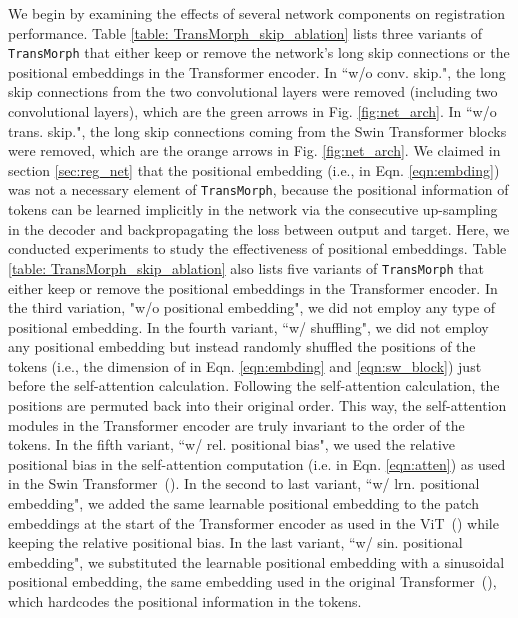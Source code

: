 \documentclass[times,twocolumn,final]{elsarticle}
\begin{document}
We begin by examining the effects of several network components on registration performance. Table \ref{table: TransMorph_skip_ablation} lists three variants of \texttt{TransMorph} that either keep or remove the network's long skip connections or the positional embeddings in the Transformer encoder. In ``w/o conv. skip.", the long skip connections from the two convolutional layers were removed (including two convolutional layers), which are the green arrows in Fig. \ref{fig:net_arch}. In ``w/o trans. skip.", the long skip connections coming from the Swin Transformer blocks were removed, which are the orange arrows in Fig. \ref{fig:net_arch}. We claimed in section \ref{sec:reg_net} that the positional embedding (i.e.,  in Eqn. \ref{eqn:embding}) was not a necessary element of \texttt{TransMorph}, because the positional information of tokens can be learned implicitly in the network via the consecutive up-sampling in the decoder and backpropagating the loss between output and target. Here, we conducted experiments to study the effectiveness of positional embeddings. Table \ref{table: TransMorph_skip_ablation} also lists five variants of \texttt{TransMorph} that either keep or remove the positional embeddings in the Transformer encoder. In the third variation, "w/o positional embedding", we did not employ any type of positional embedding. In the fourth variant, ``w/ shuffling", we did not employ any positional embedding but instead randomly shuffled the positions of the tokens (i.e., the dimension  of  in Eqn. \ref{eqn:embding} and \ref{eqn:sw_block}) just before the self-attention calculation. Following the self-attention calculation, the positions are permuted back into their original order. This way, the self-attention modules in the Transformer encoder are truly invariant to the order of the tokens. In the fifth variant, ``w/ rel. positional bias", we used the relative positional bias in the self-attention computation (i.e.  in Eqn. \ref{eqn:atten}) as used in the Swin Transformer~(\cite{liu2021swin}). In the second to last variant, ``w/ lrn. positional embedding", we added the same learnable positional embedding to the patch embeddings at the start of the Transformer encoder as used in the ViT~(\cite{dosovitskiy2020image}) while keeping the relative positional bias. In the last variant, ``w/ sin. positional embedding", we substituted the learnable positional embedding with a sinusoidal positional embedding, the same embedding used in the original Transformer~(\cite{vaswani2017attention}), which hardcodes the positional information in the tokens.
\end{document}
